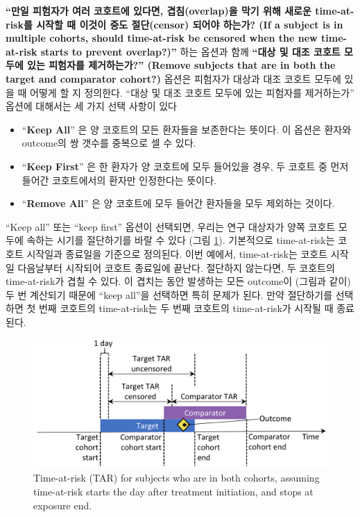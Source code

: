 \documentclass[11pt]{book}
\providecommand{\tightlist}{%
  \setlength{\itemsep}{0pt}\setlength{\parskip}{0pt}}
\theoremstyle{definition}
\theoremstyle{definition}
\theoremstyle{definition}
\theoremstyle{remark}
\begin{document}
\textbf{``만일 피험자가 여러 코호트에 있다면, 겹침(overlap)을 막기 위해
새로운 time-at-risk를 시작할 때 이것이 중도 절단(censor) 되어야 하는가?
(If a subject is in multiple cohorts, should time-at-risk be censored
when the new time-at-risk starts to prevent overlap?)''} 하는 옵션과
함께 \textbf{``대상 및 대조 코호트 모두에 있는 피험자를 제거하는가?''
(Remove subjects that are in both the target and comparator cohort?)}
옵션은 피험자가 대상과 대조 코호트 모두에 있을 때 어떻게 할 지 정의한다.
``대상 및 대조 코호트 모두에 있는 피험자를 제거하는가'' 옵션에 대해서는
세 가지 선택 사항이 있다

\begin{itemize}
\tightlist
\item
  ``\textbf{Keep All}'' 은 양 코호트의 모든 환자들을 보존한다는 뜻이다.
  이 옵션은 환자와 outcome의 쌍 갯수를 중복으로 셀 수 있다.
\item
  ``\textbf{Keep First}'' 은 한 환자가 양 코호트에 모두 들어있을 경우,
  두 코호트 중 먼저 들어간 코호트에서의 환자만 인정한다는 뜻이다.
\item
  ``\textbf{Remove All}'' 은 양 코호트에 모두 들어간 환자들을 모두
  제외하는 것이다.
\end{itemize}

``Keep all'' 또는 ``keep first'' 옵션이 선택되면, 우리는 연구 대상자가
양쪽 코호트 모두에 속하는 시기를 절단하기를 바랄 수 있다 (그림
\ref{fig:tar}). 기본적으로 time-at-risk는 코호트 시작일과 종료일을
기준으로 정의된다. 이번 예에서, time-at-risk는 코호트 시작일 다음날부터
시작되어 코호트 종료일에 끝난다. 절단하지 않는다면, 두 코호트의
time-at-risk가 겹칠 수 있다. 이 겹치는 동안 발생하는 모든 outcome이
(그림과 같이) 두 번 계산되기 때문에 ``keep all''을 선택하면 특히 문제가
된다. 만약 절단하기를 선택하면 첫 번째 코호트의 time-at-risk는 두 번째
코호트의 time-at-risk가 시작될 때 종료된다.

\begin{figure}

{\centering \includegraphics[width=0.9\linewidth]{images/PopulationLevelEstimation/tar} 

}

\caption{Time-at-risk (TAR) for subjects who are in both cohorts, assuming time-at-risk starts the day after treatment initiation, and stops at exposure end.}\label{fig:tar}
\end{figure}
\end{document}
